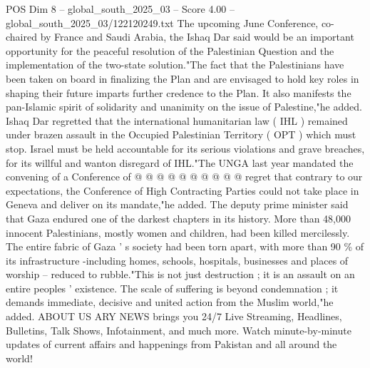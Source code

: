 \begin{textsample}{POS Dim 8 – global\_south\_2025\_03 – Score 4.00 – global\_south\_2025\_03/122120249.txt}
The upcoming June Conference, co-chaired by France and Saudi Arabia, the Ishaq Dar said would be an important opportunity for the peaceful resolution of the Palestinian Question and the implementation of the two-state solution."The fact that the Palestinians have been taken on board in finalizing the Plan and are envisaged to hold key roles in shaping their future imparts further credence to the Plan.
It also manifests the pan-Islamic spirit of solidarity and unanimity on the issue of Palestine,"he added.
Ishaq Dar regretted that the international humanitarian law ( IHL ) remained under brazen assault in the Occupied Palestinian Territory ( OPT ) which must stop.
Israel must be held accountable for its serious violations and grave breaches, for its willful and wanton disregard of IHL."The UNGA last year mandated the convening of a Conference of @ @ @ @ @ @ @ @ @ @ regret that contrary to our expectations, the Conference of High Contracting Parties could not take place in Geneva and deliver on its mandate,"he added.
The deputy prime minister said that Gaza endured one of the darkest chapters in its history.
More than 48,000 innocent Palestinians, mostly women and children, had been killed mercilessly.
The entire fabric of Gaza ' s society had been torn apart, with more than 90 \% of its infrastructure -including homes, schools, hospitals, businesses and places of worship -- reduced to rubble."This is not just destruction ; it is an assault on an entire peoples ' existence.
The scale of suffering is beyond condemnation ; it demands immediate, decisive and united action from the Muslim world,"he added.
ABOUT US ARY NEWS brings you 24/7 Live Streaming, Headlines, Bulletins, Talk Shows, Infotainment, and much more.
Watch minute-by-minute updates of current affairs and happenings from Pakistan and all around the world!

\end{textsample}

